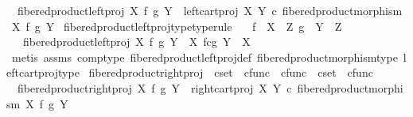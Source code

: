 \begin{isabellebody}
\ \ {\isachardoublequoteopen}fibered{\isacharunderscore}{\kern0pt}product{\isacharunderscore}{\kern0pt}left{\isacharunderscore}{\kern0pt}proj\ X\ f\ g\ Y\ {\isacharequal}{\kern0pt}\ {\isacharparenleft}{\kern0pt}left{\isacharunderscore}{\kern0pt}cart{\isacharunderscore}{\kern0pt}proj\ X\ Y{\isacharparenright}{\kern0pt}\ {\isasymcirc}\isactrlsub c\ {\isacharparenleft}{\kern0pt}fibered{\isacharunderscore}{\kern0pt}product{\isacharunderscore}{\kern0pt}morphism\ X\ f\ g\ Y{\isacharparenright}{\kern0pt}{\isachardoublequoteclose}\isanewline
\isanewline
{}\isamarkupfalse%
\ fibered{\isacharunderscore}{\kern0pt}product{\isacharunderscore}{\kern0pt}left{\isacharunderscore}{\kern0pt}proj{\isacharunderscore}{\kern0pt}type{\isacharbrackleft}{\kern0pt}type{\isacharunderscore}{\kern0pt}rule{\isacharbrackright}{\kern0pt}{\isacharcolon}{\kern0pt}\isanewline
\ \ \ {\isachardoublequoteopen}f\ {\isacharcolon}{\kern0pt}\ X\ {\isasymrightarrow}\ Z{\isachardoublequoteclose}\ {\isachardoublequoteopen}g\ {\isacharcolon}{\kern0pt}\ Y\ {\isasymrightarrow}\ Z{\isachardoublequoteclose}\isanewline
\ \ \ {\isachardoublequoteopen}fibered{\isacharunderscore}{\kern0pt}product{\isacharunderscore}{\kern0pt}left{\isacharunderscore}{\kern0pt}proj\ X\ f\ g\ Y\ {\isacharcolon}{\kern0pt}\ X\ \isactrlbsub f\isactrlesub {\isasymtimes}\isactrlsub c\isactrlbsub g\isactrlesub \ Y\ {\isasymrightarrow}\ X{\isachardoublequoteclose}\isanewline
%
\isadelimproof
\ \ %
\endisadelimproof
%
\isatagproof
{}\isamarkupfalse%
\ {\isacharparenleft}{\kern0pt}metis\ assms\ comp{\isacharunderscore}{\kern0pt}type\ fibered{\isacharunderscore}{\kern0pt}product{\isacharunderscore}{\kern0pt}left{\isacharunderscore}{\kern0pt}proj{\isacharunderscore}{\kern0pt}def\ fibered{\isacharunderscore}{\kern0pt}product{\isacharunderscore}{\kern0pt}morphism{\isacharunderscore}{\kern0pt}type\ left{\isacharunderscore}{\kern0pt}cart{\isacharunderscore}{\kern0pt}proj{\isacharunderscore}{\kern0pt}type{\isacharparenright}{\kern0pt}%
\endisatagproof
{\isafoldproof}%
%
\isadelimproof
\isanewline
%
\endisadelimproof
\isanewline
{}\isamarkupfalse%
\ fibered{\isacharunderscore}{\kern0pt}product{\isacharunderscore}{\kern0pt}right{\isacharunderscore}{\kern0pt}proj\ {\isacharcolon}{\kern0pt}{\isacharcolon}{\kern0pt}\ {\isachardoublequoteopen}cset\ {\isasymRightarrow}\ cfunc\ {\isasymRightarrow}\ cfunc\ {\isasymRightarrow}\ cset\ {\isasymRightarrow}\ cfunc{\isachardoublequoteclose}\ \isanewline
\ \ {\isachardoublequoteopen}fibered{\isacharunderscore}{\kern0pt}product{\isacharunderscore}{\kern0pt}right{\isacharunderscore}{\kern0pt}proj\ X\ f\ g\ Y\ {\isacharequal}{\kern0pt}\ {\isacharparenleft}{\kern0pt}right{\isacharunderscore}{\kern0pt}cart{\isacharunderscore}{\kern0pt}proj\ X\ Y{\isacharparenright}{\kern0pt}\ {\isasymcirc}\isactrlsub c\ {\isacharparenleft}{\kern0pt}fibered{\isacharunderscore}{\kern0pt}product{\isacharunderscore}{\kern0pt}morphism\ X\ f\ g\ Y{\isacharparenright}{\kern0pt}{\isachardoublequoteclose}\isanewline

\end{isabellebody}
